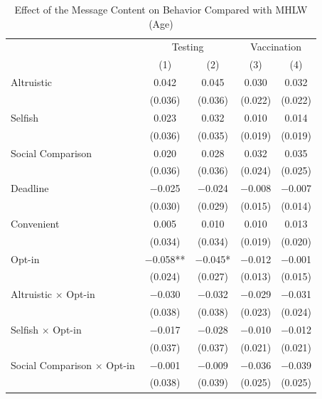\documentclass[
]{article}
\begin{document}
\begin{table}

\caption{\label{tab:reg-act-woA}Effect of the Message Content on Behavior Compared with MHLW (Age)}
\centering
\fontsize{9}{11}\selectfont
\begin{threeparttable}
\begin{tabular}[t]{lcccc}
\toprule
\multicolumn{1}{c}{ } & \multicolumn{2}{c}{Testing} & \multicolumn{2}{c}{Vaccination} \\
\cmidrule(l{3pt}r{3pt}){2-3} \cmidrule(l{3pt}r{3pt}){4-5}
  & (1) & (2) & (3) & (4)\\
\midrule
Altruistic & \num{0.042} & \num{0.045} & \num{0.030} & \num{0.032}\\
 & (\num{0.036}) & (\num{0.036}) & (\num{0.022}) & (\num{0.022})\\
Selfish & \num{0.023} & \num{0.032} & \num{0.010} & \num{0.014}\\
 & (\num{0.036}) & (\num{0.035}) & (\num{0.019}) & (\num{0.019})\\
Social Comparison & \num{0.020} & \num{0.028} & \num{0.032} & \num{0.035}\\
 & (\num{0.036}) & (\num{0.036}) & (\num{0.024}) & (\num{0.025})\\
Deadline & \num{-0.025} & \num{-0.024} & \num{-0.008} & \num{-0.007}\\
 & (\num{0.030}) & (\num{0.029}) & (\num{0.015}) & (\num{0.014})\\
Convenient & \num{0.005} & \num{0.010} & \num{0.010} & \num{0.013}\\
 & (\num{0.034}) & (\num{0.034}) & (\num{0.019}) & (\num{0.020})\\
Opt-in & \num{-0.058}** & \num{-0.045}* & \num{-0.012} & \num{-0.001}\\
 & (\num{0.024}) & (\num{0.027}) & (\num{0.013}) & (\num{0.015})\\
Altruistic $\times$ Opt-in & \num{-0.030} & \num{-0.032} & \num{-0.029} & \num{-0.031}\\
 & (\num{0.038}) & (\num{0.038}) & (\num{0.023}) & (\num{0.024})\\
Selfish $\times$ Opt-in & \num{-0.017} & \num{-0.028} & \num{-0.010} & \num{-0.012}\\
 & (\num{0.037}) & (\num{0.037}) & (\num{0.021}) & (\num{0.021})\\
Social Comparison $\times$ Opt-in & \num{-0.001} & \num{-0.009} & \num{-0.036} & \num{-0.039}\\
 & (\num{0.038}) & (\num{0.039}) & (\num{0.025}) & (\num{0.025})\\

\end{tabular}
\end{threeparttable}
\end{table}
\end{document}
